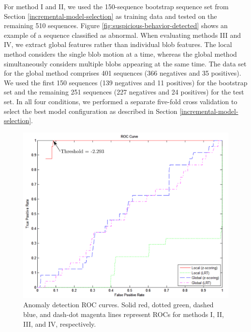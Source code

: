 For method I and II, we used the 150-sequence bootstrap sequence set
from Section \ref{incremental-model-selection} as training data and
tested on the remaining 510
sequences. Figure \ref{fig:suspicious-behavior-detected} shows an
example of a sequence classified as abnormal.  When evaluating methods
III and IV, we extract global features rather than individual blob
features. The local method considers the single blob motion at a time,
whereas the global method simultaneously considers multiple blobs
appearing at the same time. The data set for the global method
comprises 401 sequences (366 negatives and 35 positives). We used the
first 150 sequences (139 negatives and 11 positives) for the bootstrap
set and the remaining 251 sequences (227 negatives and 24 positives)
for the test set. In all four conditions, we performed a separate
five-fold cross validation to select the best model configuration as
described in Section \ref{incremental-model-selection}.

\begin{figure}[t]
  \centering
  \includegraphics[width=0.8\linewidth]{figures/roc-ours-vs-global-results}
  \caption[Anomaly detection ROC curves. Solid red, dotted green,
    dashed blue, and dash-dot magenta lines represent ROCs for methods
    I, II, III, and IV, respectively.]{\small Anomaly detection ROC
    curves. Solid red, dotted green, dashed blue, and dash-dot magenta
    lines represent ROCs for methods I, II, III, and IV,
    respectively.}
  \label{fig:roc-ours-vs-global-results}
\end{figure}


